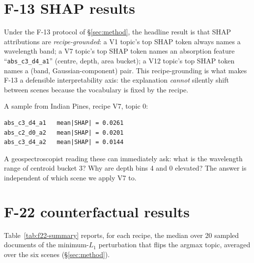 \documentclass[journal,a4paper,10pt]{IEEEtran}
\begin{document}
\section{F-13 SHAP results}\label{sec:f13}

Under the F-13 protocol of \S\ref{sec:method}, the headline result is
that SHAP attributions are
\emph{recipe-grounded}: a V1 topic's top SHAP token always names a
wavelength band; a V7 topic's top SHAP token names an absorption
feature ``\texttt{abs\_c3\_d4\_a1}'' (centre, depth, area bucket);
a V12 topic's top SHAP token names a (band, Gaussian-component)
pair. This recipe-grounding is what makes F-13 a defensible
interpretability axis: the explanation \emph{cannot} silently shift
between scenes because the vocabulary is fixed by the recipe.

A sample from Indian Pines, recipe V7, topic 0:
\begin{verbatim}
abs_c3_d4_a1   mean|SHAP| = 0.0261
abs_c2_d0_a2   mean|SHAP| = 0.0201
abs_c3_d4_a2   mean|SHAP| = 0.0144
\end{verbatim}
A geospectroscopist reading these can immediately ask: what is the
wavelength range of centroid bucket 3? Why are depth bins 4 and 0
elevated? The answer is independent of which scene we apply V7 to.

\section{F-22 counterfactual results}\label{sec:f22}

Table~\ref{tab:f22-summary} reports, for each recipe, the median over
20 sampled documents of the minimum-$L_1$ perturbation that flips the
argmax topic, averaged over the six scenes (\S\ref{sec:method}).
\end{document}
